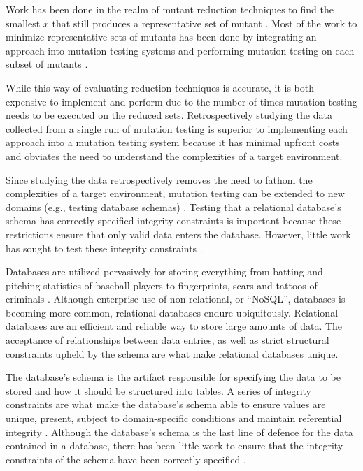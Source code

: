 Work has been done in the realm of mutant reduction techniques to find the smallest $x$ that still produces
a representative set of mutant \cite{jia2011analysis, mathur1994empirical}. Most of the work
to minimize representative sets of mutants has been done by integrating an approach into
mutation testing systems and performing mutation testing on each subset of mutants \cite{demillo1988extended, king1991fortran}.

While this way of evaluating reduction techniques is accurate, it is both
expensive to implement and perform due to the number of times mutation testing
needs to be executed on the reduced sets. Retrospectively studying the data
collected from a single run of mutation testing is superior to implementing each
approach into a mutation testing system because it has minimal upfront costs and obviates the need
to understand the complexities of a target environment.

Since studying the data retrospectively removes the need to fathom the complexities of a target environment,
mutation testing can be extended to new domains (e.g., testing database schemas) \cite{mcminn2016virtual, mcminn2015effectiveness, wright2013efficient}.
Testing that a relational database's schema has correctly specified integrity constraints is important
because these restrictions ensure that only valid data enters the database. However, little work has
sought to test these integrity constraints \cite{mcminn2016virtual}.

Databases are utilized pervasively for storing everything from batting and pitching statistics of baseball
players \cite{lahmanbaseball} to fingerprints, scars and tattoos of criminals \cite{ngi}.
Although enterprise use of non-relational, or ``NoSQL'', databases is becoming more common,
relational databases endure ubiquitously.
Relational databases are an efficient and reliable way to store large amounts of data.
The acceptance of relationships between data entries, as well as strict structural constraints
upheld by the schema are what make relational databases unique.

The database's schema is the artifact responsible for specifying the data to be stored and
how it should be structured into tables. A series of integrity constraints
are what make the database's schema able to ensure values are unique, present,
subject to domain-specific conditions and maintain referential integrity \cite{mcminn2016virtual}.
Although the database's schema is the last line of defence for the data contained
in a database, there has been little work to ensure that the integrity constraints
of the schema have been correctly specified \cite{mcminn2015effectiveness}.

